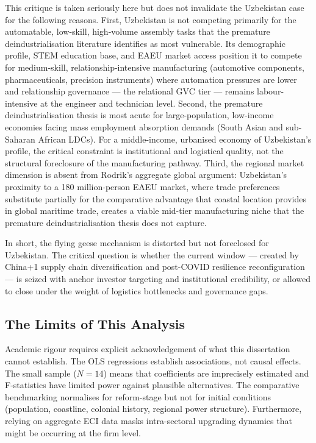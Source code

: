This critique is taken seriously here but does not invalidate the Uzbekistan case for the following reasons. First, Uzbekistan is not competing primarily for the automatable, low-skill, high-volume assembly tasks that the premature deindustrialisation literature identifies as most vulnerable. Its demographic profile, STEM education base, and EAEU market access position it to compete for medium-skill, relationship-intensive manufacturing (automotive components, pharmaceuticals, precision instruments) where automation pressures are lower and relationship governance --- the relational GVC tier --- remains labour-intensive at the engineer and technician level. Second, the premature deindustrialisation thesis is most acute for large-population, low-income economies facing mass employment absorption demands (South Asian and sub-Saharan African LDCs). For a middle-income, urbanised economy of Uzbekistan's profile, the critical constraint is institutional and logistical quality, not the structural foreclosure of the manufacturing pathway. Third, the regional market dimension is absent from Rodrik's aggregate global argument: Uzbekistan's proximity to a 180 million-person EAEU market, where trade preferences substitute partially for the comparative advantage that coastal location provides in global maritime trade, creates a viable mid-tier manufacturing niche that the premature deindustrialisation thesis does not capture.

In short, the flying geese mechanism is distorted but not foreclosed for Uzbekistan. The critical question is whether the current window --- created by China+1 supply chain diversification and post-COVID resilience reconfiguration --- is seized with anchor investor targeting and institutional credibility, or allowed to close under the weight of logistics bottlenecks and governance gaps.

\subsection{The Limits of This Analysis}

Academic rigour requires explicit acknowledgement of what this dissertation cannot establish. The OLS regressions establish associations, not causal effects. The small sample ($N=14$) means that coefficients are imprecisely estimated and F-statistics have limited power against plausible alternatives. The comparative benchmarking normalises for reform-stage but not for initial conditions (population, coastline, colonial history, regional power structure). Furthermore, relying on aggregate ECI data masks intra-sectoral upgrading dynamics that might be occurring at the firm level.

